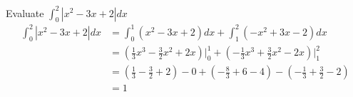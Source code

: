 \documentclass[11pt]{article}
\theoremstyle{plain}
\theoremstyle{remark}
\theoremstyle{plain}
\begin{document}
\begin{tcolorbox}[colback=magenta!5!white,colframe=magenta!75!black,title=Problem 5]
    Evaluate $\int_0^2|x^2-3x+2|dx$\\

    \begin{align*}
        \int_0^2|x^2-3x+2|dx &=\int_0^1(x^2-3x+2)dx+\int_1^2(-x^2+3x-2)dx \\
        &=(\frac{1}{3}x^3-\frac{3}{2}x^2+2x)\Big|_0^1+(-\frac{1}{3}x^3+\frac{3}{2}x^2-2x)\Big|_1^2 \\
        &=(\frac{1}{3}-\frac{3}{2}+2)-0+(-\frac{8}{3}+6-4)-(-\frac{1}{3}+\frac{3}{2}-2) \\
        &= 1
    \end{align*}
\end{tcolorbox}   
\end{document}

